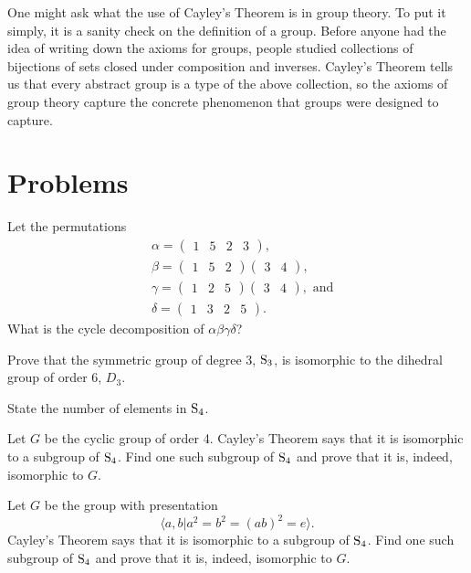 One might ask what the use of Cayley's Theorem is in group theory. To put it simply, it is a sanity check on the definition of a group. Before anyone had the idea of writing down the axioms for groups, people studied collections of bijections of sets closed under composition and inverses. Cayley's Theorem tells us that every abstract group is a type of the above collection, so the axioms of group theory capture the concrete phenomenon that groups were designed to capture.

\newpage

\section{Problems}
\begin{problem}
    Let the permutations
    \begin{align*}
        &\alpha = \begin{pmatrix}1 & 5 & 2 & 3\end{pmatrix},\\
        &\beta  = \begin{pmatrix}1 & 5 & 2\end{pmatrix}\begin{pmatrix}3 & 4\end{pmatrix},\\
        &\gamma = \begin{pmatrix}1 & 2 & 5\end{pmatrix}\begin{pmatrix}3 & 4\end{pmatrix}, \text{ and}\\
        &\delta = \begin{pmatrix}1 & 3 & 2 & 5\end{pmatrix}.
    \end{align*}
    What is the cycle decomposition of $\alpha\beta\gamma\delta$?
\end{problem}

\begin{problem}
    Prove that the symmetric group of degree 3, $\mathrm{S}_{3}$, is isomorphic to the dihedral group of order 6, $D_3$.
\end{problem}

\begin{problem}
    State the number of elements in $\mathrm{S}_{4}$.
    \begin{partquestions}{\alph*}
        \item Let $G$ be the cyclic group of order 4. Cayley's Theorem says that it is isomorphic to a subgroup of $\mathrm{S}_{4}$. Find one such subgroup of $\mathrm{S}_{4}$ and prove that it is, indeed, isomorphic to $G$.
        \item Let $G$ be the group with presentation
        \[
            \langle a, b \vert a^2 = b^2 = (ab)^2 = e \rangle.
        \]
        Cayley's Theorem says that it is isomorphic to a subgroup of $\mathrm{S}_{4}$. Find one such subgroup of $\mathrm{S}_{4}$ and prove that it is, indeed, isomorphic to $G$.
    \end{partquestions}
\end{problem}
